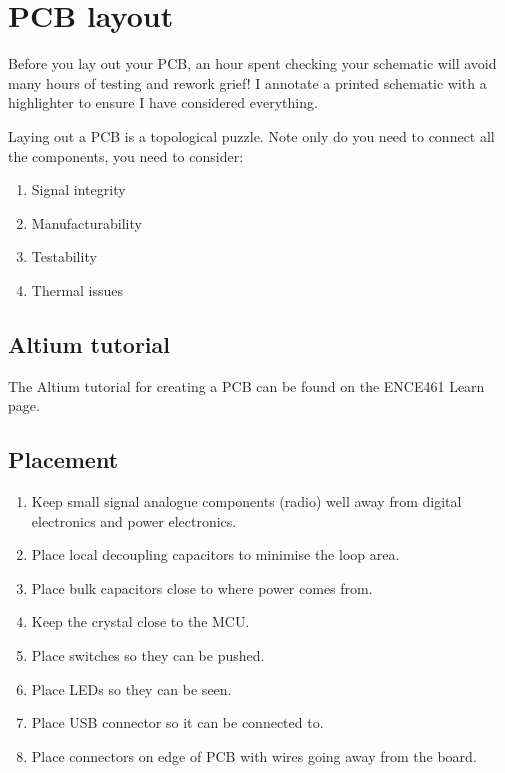 \chapter{PCB layout}

Before you lay out your PCB, an hour spent checking your schematic
will avoid many hours of testing and rework grief!  I annotate a
printed schematic with a highlighter to ensure I have considered
everything.

Laying out a PCB is a topological puzzle.  Note only do you need to
connect all the components, you need to consider:
%
\begin{enumerate}
\item Signal integrity

\item Manufacturability

\item Testability

\item Thermal issues
\end{enumerate}



\section{Altium tutorial}

The Altium tutorial for creating a PCB can be found on the ENCE461
Learn page.


\label{pcb-recommendations}

\section{Placement}
\label{placement}

\begin{enumerate}
\item
  Keep small signal analogue components (radio) well away from digital
  electronics and power electronics.
\item
  Place local decoupling capacitors to minimise the loop area.
\item
  Place bulk capacitors close to where power comes from.
\item
  Keep the crystal close to the MCU.
\item
  Place switches so they can be pushed.
\item
  Place LEDs so they can be seen.
\item
  Place USB connector so it can be connected to.
\item
  Place connectors on edge of PCB with wires going away from the board.
\end{enumerate}


